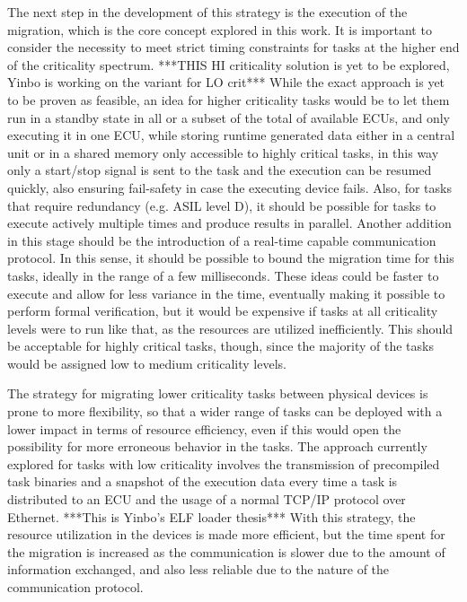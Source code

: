 The next step in the development of this strategy is the execution of the migration, which is the core concept explored in this work. It is important to consider the necessity to meet strict timing constraints for tasks at the higher end of the criticality spectrum. ***THIS HI criticality solution is yet to be explored, Yinbo is working on the variant for LO crit*** While the exact approach is yet to be proven as feasible, an idea for higher criticality tasks would be to let them run in a standby state in all or a subset of the total of available ECUs, and only executing it in one ECU, while storing runtime generated data either in a central unit or in a shared memory only accessible to highly critical tasks, in this way only a start/stop signal is sent to the task and the execution can be resumed quickly, also ensuring fail-safety in case the executing device fails. Also, for tasks that require redundancy (e.g. ASIL level D), it should be possible for tasks to execute actively multiple times and produce results in parallel. Another addition in this stage should be the introduction of a real-time capable communication protocol. In this sense, it should be possible to bound the migration time for this tasks, ideally in the range of a few milliseconds. These ideas could be faster to execute and allow for less variance in the time, eventually making it possible to perform formal verification, but it would be expensive if tasks at all criticality levels were to run like that, as the resources are utilized inefficiently. This should be acceptable for highly critical tasks, though, since the majority of the tasks would be assigned low to medium criticality levels.

The strategy for migrating lower criticality tasks between physical devices is prone to more flexibility, so that a wider range of tasks can be deployed with a lower impact in terms of resource efficiency, even if this would open the possibility for more erroneous behavior in the tasks. The approach currently explored for tasks with low criticality involves the transmission of precompiled task binaries and a snapshot of the execution data every time a task is distributed to an ECU and the usage of a normal TCP/IP protocol over Ethernet. ***This is Yinbo's ELF loader thesis*** With this strategy, the resource utilization in the devices is made more efficient, but the time spent for the migration is increased as the communication is slower due to the amount of information exchanged, and also less reliable due to the nature of the communication protocol. 


